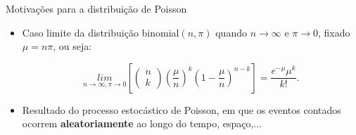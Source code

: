\documentclass[10pt, aspectratio=169]{beamer}
\begin{document}


\begin{frame}{Motivações para a distribuição de Poisson}
    


    \vspace{0,5cm}
    
    \begin{itemize}
        \item Caso limite da distribuição binomial$(n, \pi)$ quando $n\rightarrow \infty$ e $\pi\rightarrow 0$, fixado $\mu=n\pi$, ou seja:

$$
     \underset{n \to \infty, \pi \to 0 }{lim}
\left [ \begin{pmatrix}
 n\\k 
\end{pmatrix} \left ( \frac{\mu}{n} \right )^{k}\left ( 1-\frac{\mu}{n} \right )^{n-k}\right ]=\frac{e^{-\mu}\mu^{k}}{k!}.
$$

    \vspace{0,5cm}

        \item Resultado do processo estocástico de Poisson, em que os eventos contados ocorrem \textbf{aleatoriamente} ao longo do tempo, espaço,...

    \end{itemize}
    
\end{frame}


\end{document}
